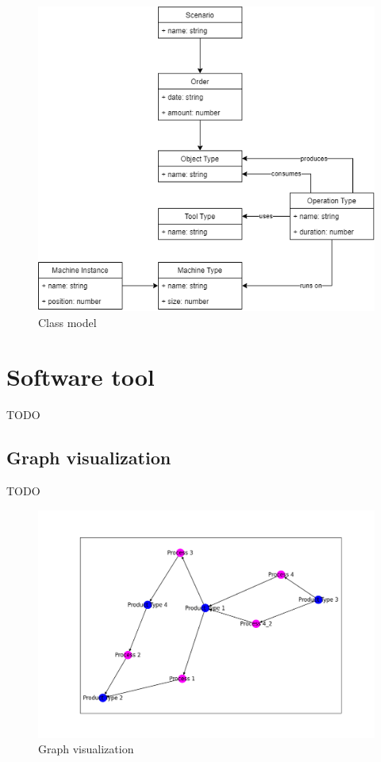 \documentclass{article}
\begin{document}
    \begin{figure}
        \centering
        \includegraphics[width=\textwidth]{../../models/class-model.png}
        \caption{Class model}
        \label{fig:model}
    \end{figure}

    \section{Software tool}
    \label{sec:tool}
    TODO

    \subsection{Graph visualization}
    TODO

    \begin{figure}
        \includegraphics[width=\textwidth]{../../screenshots/networkx.png}
        \caption{Graph visualization}
    \end{figure}
\end{document}
